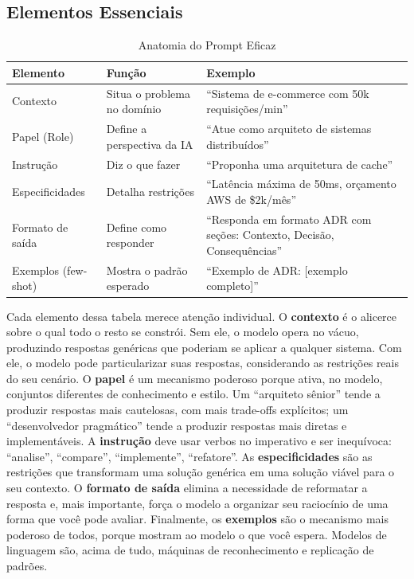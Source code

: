 \subsection{Elementos Essenciais}

\begin{table}[ht]
\centering
\caption{Anatomia do Prompt Eficaz}
\begin{tabular}{@{}p{3.5cm}p{4.5cm}p{5cm}@{}}
\toprule
\textbf{Elemento} & \textbf{Função} & \textbf{Exemplo} \\
\midrule
Contexto & Situa o problema no domínio & ``Sistema de e-commerce com 50k
    requisições/min'' \\
Papel (Role) & Define a perspectiva da IA & ``Atue como arquiteto de
    sistemas distribuídos'' \\
Instrução & Diz o que fazer & ``Proponha uma arquitetura de cache'' \\
Especificidades & Detalha restrições & ``Latência máxima de 50ms,
    orçamento AWS de \$2k/mês'' \\
Formato de saída & Define como responder & ``Responda em formato ADR com
    seções: Contexto, Decisão, Consequências'' \\
Exemplos (few-shot) & Mostra o padrão esperado & ``Exemplo de ADR:
    [exemplo completo]'' \\
\bottomrule
\end{tabular}
\end{table}

Cada elemento dessa tabela merece atenção individual. O \textbf{contexto} é o
alicerce sobre o qual todo o resto se constrói. Sem ele, o modelo opera no vácuo,
produzindo respostas genéricas que poderiam se aplicar a qualquer sistema. Com
ele, o modelo pode particularizar suas respostas, considerando as restrições reais
do seu cenário. O \textbf{papel} é um mecanismo poderoso porque ativa, no modelo,
conjuntos diferentes de conhecimento e estilo. Um ``arquiteto sênior'' tende a
produzir respostas mais cautelosas, com mais trade-offs explícitos; um
``desenvolvedor pragmático'' tende a produzir respostas mais diretas e
implementáveis. A \textbf{instrução} deve usar verbos no imperativo e ser
inequívoca: ``analise'', ``compare'', ``implemente'', ``refatore''. As
\textbf{especificidades} são as restrições que transformam uma solução genérica em
uma solução viável para o seu contexto. O \textbf{formato de saída} elimina a
necessidade de reformatar a resposta e, mais importante, força o modelo a
organizar seu raciocínio de uma forma que você pode avaliar. Finalmente, os
\textbf{exemplos} são o mecanismo mais poderoso de todos, porque mostram ao
modelo o que você espera. Modelos de linguagem são, acima de tudo,
máquinas de reconhecimento e replicação de padrões.


